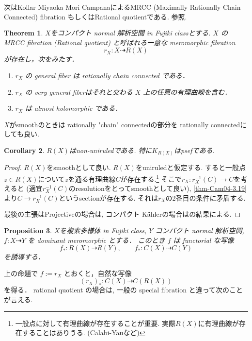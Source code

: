 \documentclass[dvipdfmx,a4paper,11pt]{article} %
\newtheorem{thm}{Theorem}[section]
\newtheorem{cor}[thm]{Corollary}
\newtheorem{prop}[thm]{Proposition}
\theoremstyle{definition}
\theoremstyle{remark}
\numberwithin{equation}{section}
\begin{document}
次はKollar-Miyaoka-Mori-CampanaによるMRCC (Maximally Rationally Chain Connected) fibration もしくはRational quotientである. \cite{Deb01}参照. 
\begin{thm}\cite[Theorem 3.23]{Cam04}
$X$をコンパクト normal 解析空間 in Fujiki classとする. 
$X$ の MRCC fibration (Rational quotient) と呼ばれる一意な meromorphic fibration
\[
r_X : X \dashrightarrow R(X)
\]
が存在し，次をみたす．
\begin{enumerate}
\item $r_X$ の general fiber は rationally chain connected である．
\item $r_X$ の very general fiberはそれと交わる $X$ 上の任意の有理曲線を含む．
\item $r_X$ は almost holomorphic である．
\end{enumerate}
\end{thm}
$X$がsmoothのときは rationally "chain" connectedの部分を rationally connectedにしても良い.
\begin{cor}
$R(X)$はnon-uniruledである. 特に$K_{R(X)}$はpsefである.
\end{cor}
\begin{proof}
$R(X)$をsmoothとして良い. 
$R(X)$をuniruledと仮定する. すると一般点$z \in R(X)$について$z$を通る有理曲線$C$が存在する.\footnote{一般点に対して有理曲線が存在することが重要. 実際$R(X)$に有理曲線が存在することはありうる. (Calabi-Yauなど)}
そこで$r_X : r_{X}^{-1}(C) \to C$を考えると (適宜$r_{X}^{-1}(C)$のresolutionをとってsmoothとして良い), 
\ref{thm-Cam04-3.19}より$C \to r_{X}^{-1}(C)$というsectionが存在する.
それは$r_{X}$の2番目の条件に矛盾する. 

最後の主張はProjectiveの場合は\cite{BDPP13}, コンパクト K\"ahlerの場合は\cite{Ou25}の結果による. 
\end{proof}



\begin{prop}\cite[Proposition 3.25]{Cam04}
$X$を複素多様体 in Fujiki class, $Y$ コンパクト normal 解析空間, 
$f : X \dashrightarrow Y$ を dominant meromorphic とする．
このとき $f$ は functorial な写像
\[
f_* : R(X) \dashrightarrow R(Y), \qquad f_* : C(X) \dashrightarrow C(Y)
\]
を誘導する．
\end{prop}

上の命題で $f := r_X$ とおくと，自然な写像
\[
(r_X)_* : C(X) \dashrightarrow C(R(X))
\]
を得る． 
rational quotient の場合は, 一般の special fibration と違って次のことが言える.
\end{document}
